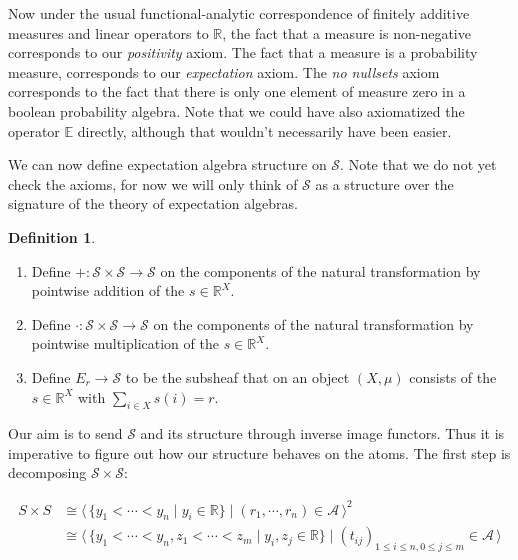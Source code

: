 \documentclass[a4paper]{amsproc}
\theoremstyle{plain}
\theoremstyle{definition}
\newtheorem{definition}[theorem]{Definition}
\theoremstyle{remark}
\numberwithin{equation}{section}
\newcommand{\la}{\langle\,}
\newcommand{\ra}{\,\rangle}
\begin{document}
Now under the usual functional-analytic correspondence of finitely additive measures and linear operators to $\mathbb{R}$, the fact that a measure is non-negative corresponds to our \emph{positivity} axiom. The fact that a measure is a probability measure, corresponds to our \emph{expectation} axiom. The \emph{no nullsets} axiom corresponds to the fact that there is only one element of measure zero in a boolean probability algebra. Note that we could have also axiomatized the operator $\mathbb{E}$ directly, although that wouldn't necessarily have been easier.


We can now define expectation algebra structure on $\mathcal{S}$. Note that we do not yet check the axioms, for now we will only think of $\mathcal{S}$ as a structure over the signature of the theory of expectation algebras.

\begin{definition}
    \begin{enumerate}
        \item Define $+: \mathcal{S} \times \mathcal{S} \to \mathcal{S}$ on the components of the natural transformation by pointwise addition of the $s \in \mathbb{R}^X$.
        \item Define $\cdot: \mathcal{S} \times \mathcal{S} \to \mathcal{S}$ on the components of the natural transformation by pointwise multiplication of the $s \in \mathbb{R}^X$.
        \item Define $E_r \xrightarrow{} \mathcal{S}$ to be the subsheaf that on an object $(X,\mu)$ consists of the $s \in \mathbb{R}^X$ with $\sum_{i \in X} s(i) = r$.
    \end{enumerate}
\end{definition}

Our aim is to send $\mathcal{S}$ and its structure through inverse image functors. Thus it is imperative to figure out how our structure behaves on the atoms. The first step is decomposing $\mathcal{S} \times \mathcal{S}$:

\begin{align*}
    S \times S &\cong \la \{y_1 < \cdots < y_n \mid y_i \in \mathbb{R} \} \mid (r_1, \cdots, r_n) \in \mathcal{A} \ra^2 \\
    &\cong \la \{y_1 < \cdots < y_n, z_1 < \cdots < z_m \mid y_i, z_j \in \mathbb{R} \} \mid (t_{ij})_{1 \leq i \leq n, 0 \leq j \leq m} \in \mathcal{A}\ra
\end{align*}
\end{document}

